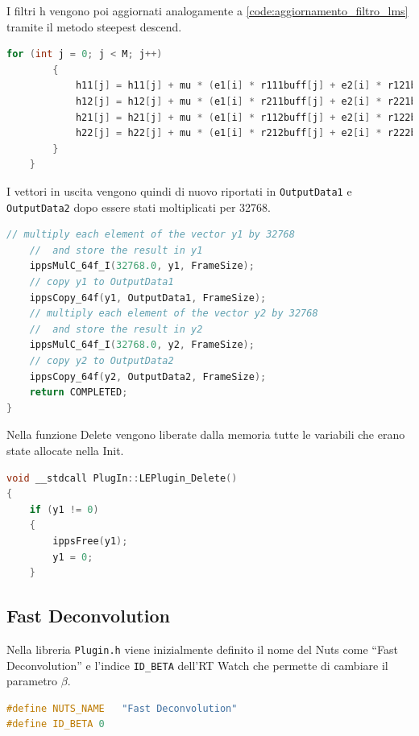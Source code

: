 \documentclass[12pt,a4paper,titlepage]{article}
\begin{document}
I filtri h vengono poi aggiornati analogamente a \ref{code:aggiornamento_filtro_lms} tramite il metodo steepest descend.
\begin{lstlisting}[language=cpp, label=code:agg, caption = Aggiornamento dei filtri h, breaklines = false, captionpos = b]
		for (int j = 0; j < M; j++)
		{
			h11[j] = h11[j] + mu * (e1[i] * r111buff[j] + e2[i] * r121buff[j]);
			h12[j] = h12[j] + mu * (e1[i] * r211buff[j] + e2[i] * r221buff[j]);
			h21[j] = h21[j] + mu * (e1[i] * r112buff[j] + e2[i] * r122buff[j]);
			h22[j] = h22[j] + mu * (e1[i] * r212buff[j] + e2[i] * r222buff[j]);
		}	
	}
\end{lstlisting}
I vettori in uscita vengono quindi di nuovo riportati in \texttt{OutputData1} e \texttt{OutputData2} dopo essere stati moltiplicati per 32768.
\begin{lstlisting}[language=cpp, label=code:output, caption = Aggiornamento delle uscite e scaling, breaklines = false, captionpos = b]
	// multiply each element of the vector y1 by 32768 
	//	and store the result in y1
	ippsMulC_64f_I(32768.0, y1, FrameSize);
	// copy y1 to OutputData1
	ippsCopy_64f(y1, OutputData1, FrameSize);
	// multiply each element of the vector y2 by 32768 
	//	and store the result in y2
	ippsMulC_64f_I(32768.0, y2, FrameSize);
	// copy y2 to OutputData2
	ippsCopy_64f(y2, OutputData2, FrameSize);
	return COMPLETED;
}
\end{lstlisting}
Nella funzione Delete vengono liberate dalla memoria tutte le variabili che erano state allocate nella Init.
\begin{lstlisting}[language=cpp, label=code:delete, caption = Delete, breaklines = false, captionpos = b]
void __stdcall PlugIn::LEPlugin_Delete()
{
	if (y1 != 0)
	{
		ippsFree(y1);
		y1 = 0;
	}
\end{lstlisting}

\subsection{Fast Deconvolution}
\label{sec:codice_c_fd}
Nella libreria \texttt{Plugin.h} viene inizialmente definito il nome del Nuts come ``Fast Deconvolution'' e l'indice \texttt{ID\_BETA} dell'RT Watch che permette di cambiare il parametro $\beta$.

\begin{lstlisting}[language=cpp, label=code:costanti_c, caption = Dichiarazione delle costanti in \texttt{Plugin.h},captionpos = b]
#define NUTS_NAME	"Fast Deconvolution"
#define ID_BETA 0
\end{lstlisting}
\end{document}

